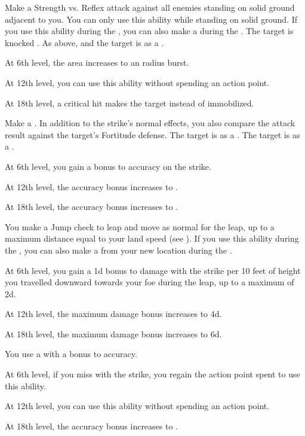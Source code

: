 {             Make a Strength vs. Reflex attack against all enemies standing on solid ground adjacent to you.
            You can only use this ability while standing on solid ground.
            If you use this ability during the , you can also make a  during the .
             The target is knocked \prone.
             As above, and the target is \immobilized as a .
            \par At 6th level, the area increases to an \areamed radius burst.
            \par At 12th level, you can use this ability without spending an action point.
            \par At 18th level, a critical hit makes the target \stunned instead of immobilized.

             Make a .
            In addition to the strike's normal effects, you also compare the attack result against the target's Fortitude defense.
             The target is \sickened as a .
             The target is \nauseated as a .
            \par At 6th level, you gain a  bonus to accuracy on the strike.
            \par At 12th level, the accuracy bonus increases to .
            \par At 18th level, the accuracy bonus increases to .

             You make a Jump check to leap and move as normal for the leap, up to a maximum distance equal to your land speed (see ).
            If you use this ability during the , you can also make a  from your new location during the .
            \par At 6th level, you gain a \plus1d bonus to damage with the strike per 10 feet of height you travelled downward towards your foe during the leap, up to a maximum of \plus2d.
            \par At 12th level, the maximum damage bonus increases to \plus4d.
            \par At 18th level, the maximum damage bonus increases to \plus6d.

             You use a  with a  bonus to accuracy.
            \par At 6th level, if you miss with the strike, you regain the action point spent to use this ability.
            \par At 12th level, you can use this ability without spending an action point.
            \par At 18th level, the accuracy bonus increases to .

}
